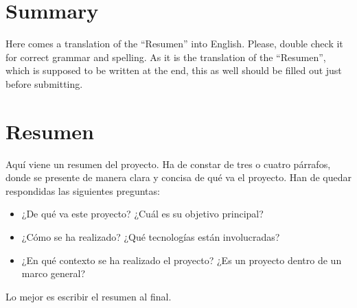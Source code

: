 \documentclass[a4paper, 12pt]{book}
\begin{document}

\chapter*{Summary}

Here comes a translation of the ``Resumen'' into English. Please, double check
it for correct grammar and spelling. As it is the translation of the ``Resumen'',
which is supposed to be written at the end, this as well should be filled out
just before submitting.



\chapter*{Resumen}

Aquí viene un resumen del proyecto. Ha de constar de tres o cuatro párrafos,
donde se presente de manera clara y concisa de qué va el proyecto. Han
de quedar respondidas las siguientes preguntas:

\begin{itemize}
  \item ¿De qué va este proyecto? ¿Cuál es su objetivo principal?
  \item ¿Cómo se ha realizado? ¿Qué tecnologías están involucradas?
  \item ¿En qué contexto se ha realizado el proyecto? ¿Es un proyecto
dentro de un marco general?
\end{itemize}
Lo mejor es escribir el resumen al final.


\tableofcontents
\cleardoublepage
\listoffigures %
\end{document}
